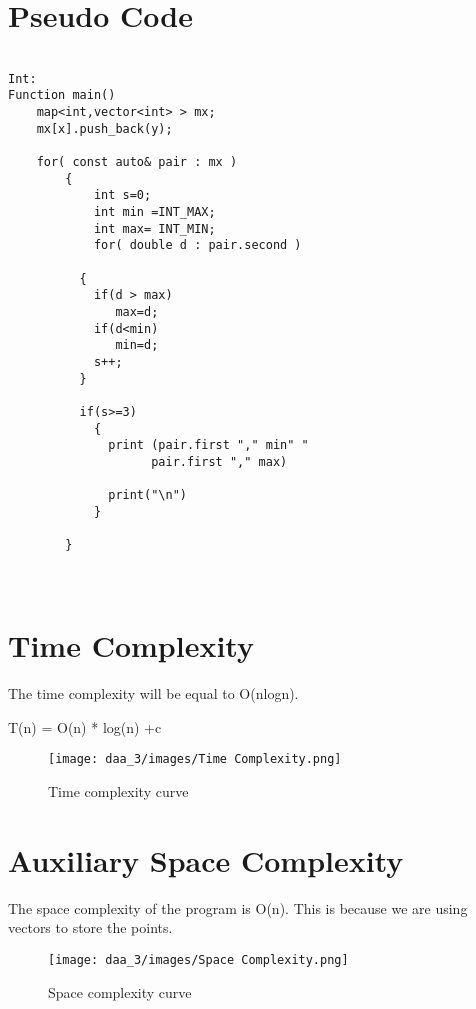 \documentclass[conference]{IEEEtran}
\begin{document}
\section{\textbf{Pseudo Code}} 


\begin{lstlisting}

Int:
Function main()
    map<int,vector<int> > mx;
    mx[x].push_back(y);
    
    for( const auto& pair : mx )
        {
            int s=0;
            int min =INT_MAX;
            int max= INT_MIN;
            for( double d : pair.second )
          
          {   
            if(d > max)
               max=d;
            if(d<min)
               min=d;
            s++;
          }
          
          if(s>=3)
            {
              print (pair.first "," min" " 
                    pair.first "," max) 
                    
              print("\n")
            }
            
        }



\end{lstlisting}

\medskip

\section{\textbf {Time Complexity}}
\noindent The time complexity will be equal to O(nlogn).

T(n) = O(n) * log(n) +c\
\begin{figure}[htp]
    \centering
    \texttt{[image: daa\_3/images/Time Complexity.png]}
    \caption{Time complexity curve}
    \label{fig:Time Complexity.png}
\end{figure}

\section{\textbf {Auxiliary Space Complexity}}
\noindent The space complexity of the program is O(n). This is because we are using vectors to store the points.

\begin{figure}[htp]
    \centering
    \texttt{[image: daa\_3/images/Space Complexity.png]}
    \caption{Space complexity curve}
    \label{fig:spacecomplexity.png}
\end{figure}
\end{document}

